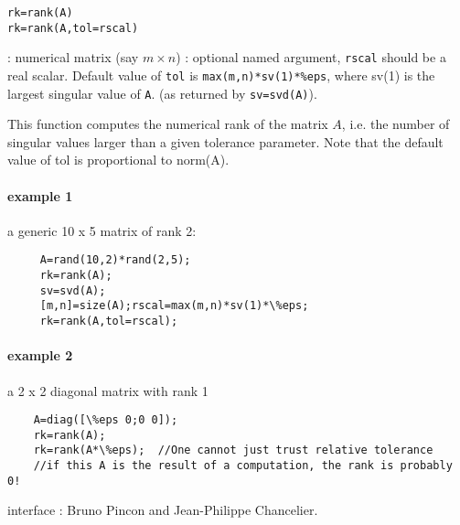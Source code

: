 
\begin{mandesc}
\end{mandesc}

\begin{calling_sequence}
\begin{verbatim}
rk=rank(A)
rk=rank(A,tol=rscal)
\end{verbatim}
\end{calling_sequence}
\begin{parameters}
  \begin{varlist}
    :  numerical matrix (say $m \times n$)
    : optional named argument, \verb+rscal+ should be a real scalar. Default value of \verb+tol+ is \verb+max(m,n)*sv(1)*%eps+, where sv(1) is the largest singular value of \verb+A+. (as returned by \verb+sv=svd(A)+).
  \end{varlist}
\end{parameters}

\begin{mandescription}
This function computes the numerical rank of the matrix $A$, i.e. the number
of singular values larger than a given tolerance parameter. Note that the 
default value of tol is proportional to norm(A).
\end{mandescription}

\begin{examples}
\paragraph{example 1} a generic 10 x 5 matrix of rank 2:
  \begin{Verbatim}
     A=rand(10,2)*rand(2,5);
     rk=rank(A);
     sv=svd(A);
     [m,n]=size(A);rscal=max(m,n)*sv(1)*\%eps;
     rk=rank(A,tol=rscal);
  \end{Verbatim}
\paragraph{example 2} a 2 x 2 diagonal matrix with rank 1
  \begin{Verbatim}
    A=diag([\%eps 0;0 0]);
    rk=rank(A);
    rk=rank(A*\%eps);  //One cannot just trust relative tolerance
    //if this A is the result of a computation, the rank is probably 0! 
  \end{Verbatim}

\end{examples}

\begin{manseealso}
\end{manseealso}

\begin{authors}
   interface : Bruno Pincon and Jean-Philippe Chancelier. 
\end{authors}
